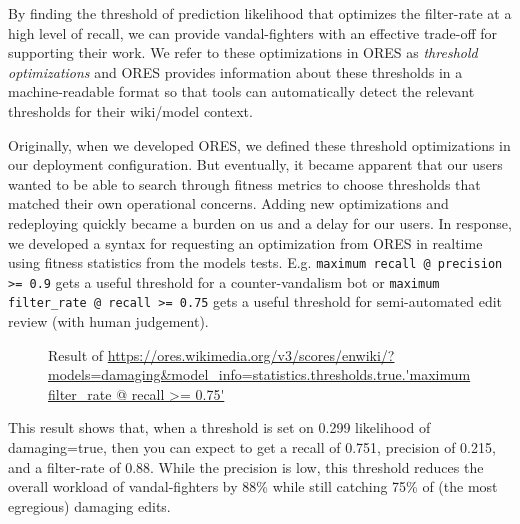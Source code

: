 By finding the threshold of prediction likelihood that optimizes the filter-rate at a high level of recall, we can provide vandal-fighters with an effective trade-off for supporting their work.  We refer to these optimizations in ORES as \emph{threshold optimizations} and ORES provides information about these thresholds in a machine-readable format so that tools can automatically detect the relevant thresholds for their wiki/model context.

Originally, when we developed ORES, we defined these threshold optimizations in our deployment configuration.  But eventually, it became apparent that our users wanted to be able to search through fitness metrics to choose thresholds that matched their own operational concerns.  Adding new optimizations and redeploying quickly became a burden on us and a delay for our users.  In response, we developed a syntax for requesting an optimization from ORES in realtime using fitness statistics from the models tests. E.g. \texttt{maximum recall @ precision >= 0.9} gets a useful threshold for a counter-vandalism bot or \texttt{maximum filter\_rate @ recall >= 0.75} gets a useful threshold for semi-automated edit review (with human judgement).

\begin{figure}[htbp]
        \caption{Result of \url{https://ores.wikimedia.org/v3/scores/enwiki/?models=damaging&model_info=statistics.thresholds.true.'maximum filter_rate @ recall >= 0.75'}}
        \label{fig:english_damaging_threshold_optimization}
\end{figure}

This result shows that, when a threshold is set on 0.299 likelihood of damaging=true, then you can expect to get a recall of 0.751, precision of 0.215, and a filter-rate of 0.88.  While the precision is low, this threshold reduces the overall workload of vandal-fighters by 88\% while still catching 75\% of (the most egregious) damaging edits.

